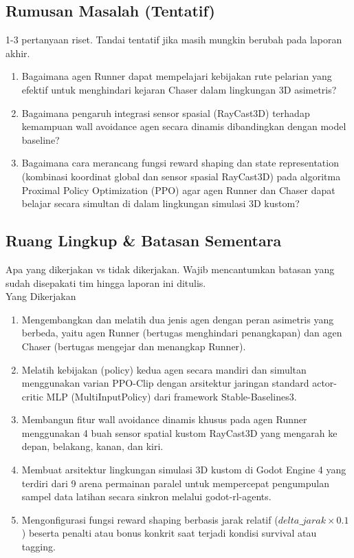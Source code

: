 \documentclass[12pt,a4paper]{article}
\begin{document}
\subsection{Rumusan Masalah (Tentatif)}
1-3 pertanyaan riset. Tandai tentatif jika masih mungkin berubah pada laporan akhir.

\begin{enumerate}
    \item[RM1.] Bagaimana agen Runner dapat mempelajari kebijakan rute pelarian yang efektif untuk menghindari kejaran Chaser dalam lingkungan 3D asimetris?
    \item[RM2.] Bagaimana pengaruh integrasi sensor spasial (RayCast3D) terhadap kemampuan wall avoidance agen secara dinamis dibandingkan dengan model baseline?
    \item[RM3.] Bagaimana cara merancang fungsi reward shaping dan state representation (kombinasi koordinat global dan sensor spasial RayCast3D) pada algoritma Proximal Policy Optimization (PPO) agar agen Runner dan Chaser dapat belajar secara simultan di dalam lingkungan simulasi 3D kustom?
    
\end{enumerate}

\subsection{Ruang Lingkup \& Batasan Sementara}
Apa yang dikerjakan vs tidak dikerjakan. Wajib mencantumkan batasan yang sudah disepakati tim hingga laporan ini ditulis. \\

Yang Dikerjakan
\begin{enumerate}
    \item Mengembangkan dan melatih dua jenis agen dengan peran asimetris yang berbeda, yaitu agen Runner (bertugas menghindari penangkapan) dan agen Chaser (bertugas mengejar dan menangkap Runner).
    \item Melatih kebijakan (policy) kedua agen secara mandiri dan simultan menggunakan varian PPO-Clip dengan arsitektur jaringan standard actor-critic MLP (MultiInputPolicy) dari framework Stable-Baselines3. 
    \item Membangun fitur wall avoidance dinamis khusus pada agen Runner menggunakan 4 buah sensor spatial kustom RayCast3D yang mengarah ke depan, belakang, kanan, dan kiri.
    \item Membuat arsitektur lingkungan simulasi 3D kustom di Godot Engine 4 yang terdiri dari 9 arena permainan paralel untuk mempercepat pengumpulan sampel data latihan secara sinkron melalui godot-rl-agents.
    \item Mengonfigurasi fungsi reward shaping berbasis jarak relatif ($delta\_jarak \times 0.1$) beserta penalti atau bonus konkrit saat terjadi kondisi survival atau tagging.
\end{enumerate}
\end{document}
